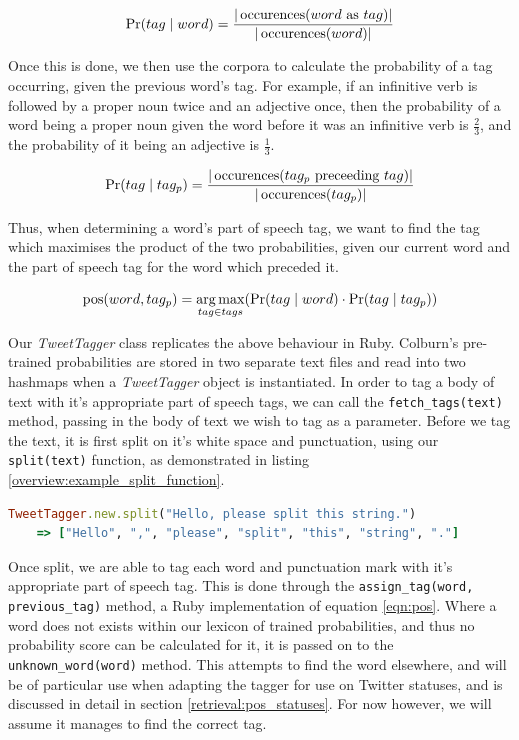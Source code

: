 \begin{equation}
	\Pr(tag \mid word) = \frac{|\operatorname*{occurences}(word \text{ as } tag)|}{|\operatorname*{occurences}(word)|}
\end{equation}

Once this is done, we then use the corpora to calculate the probability of a tag occurring, given the previous word's tag. For example, if an infinitive verb is followed by a proper noun twice and an adjective once, then the probability of a word being a proper noun given the word before it was an infinitive verb is $\frac{2}{3}$, and the probability of it being an adjective is $\frac{1}{3}$.

\begin{equation}
	\Pr(tag \mid tag_{p}) = \frac{|\operatorname*{occurences}(tag_{p} \text{ preceeding } tag)|}{|\operatorname*{occurences}(tag_p)|}
\end{equation}

Thus, when determining a word's part of speech tag, we want to find the tag which maximises the product of the two probabilities, given our current word and the part of speech tag for the word which preceded it.

\begin{equation}
	\label{eqn:pos}
	\operatorname*{pos}(word,tag_{p}) = \operatorname*{arg\,max}_{tag \in tags} (\Pr(tag \mid word) \cdot \Pr(tag \mid tag_{p}))
\end{equation}

Our \emph{TweetTagger} class replicates the above behaviour in Ruby. Colburn's pre-trained probabilities are stored in two separate text files and read into two hashmaps when a \emph{TweetTagger} object is instantiated. In order to tag a body of text with it's appropriate part of speech tags, we can call the \texttt{fetch\_tags(text)} method, passing in the body of text we wish to tag as a parameter. Before we tag the text, it is first split on it's white space and punctuation, using our \texttt{split(text)} function, as demonstrated in listing \ref{overview:example_split_function}.

\begin{lstlisting}[language=Ruby, numbers=none, caption={Example use of split function}, label=overview:example_split_function]
TweetTagger.new.split("Hello, please split this string.")
	=> ["Hello", ",", "please", "split", "this", "string", "."]
\end{lstlisting}

Once split, we are able to tag each word and punctuation mark with it's appropriate part of speech tag. This is done through the \texttt{assign\_tag\-(word\-, \-previous\_tag)} method, a Ruby implementation of equation \ref{eqn:pos}. Where a word does not exists within our lexicon of trained probabilities, and thus no probability score can be calculated for it, it is passed on to the \texttt{unknown\_word\-(word)} method. This attempts to find the word elsewhere, and will be of particular use when adapting the tagger for use on Twitter statuses, and is discussed in detail in section \ref{retrieval:pos_statuses}. For now however, we will assume it manages to find the correct tag.

